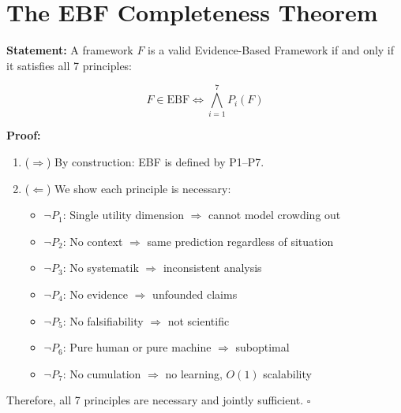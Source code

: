 \section{The EBF Completeness Theorem}
\label{sec:pr-completeness}

\begin{tcolorbox}[colback=blue!10!white, colframe=blue!75!black,
    title=\textbf{Theorem UNMAPPED_PR-1: EBF Completeness}]

\textbf{Statement:} A framework $F$ is a valid Evidence-Based Framework if and only if it satisfies all 7 principles:

\begin{equation}
F \in \text{EBF} \iff \bigwedge_{i=1}^{7} P_i(F)
\end{equation}

\textbf{Proof:}
\begin{enumerate}
    \item ($\Rightarrow$) By construction: EBF is defined by P1--P7.
    \item ($\Leftarrow$) We show each principle is necessary:
    \begin{itemize}[nosep]
        \item $\neg P_1$: Single utility dimension $\Rightarrow$ cannot model crowding out
        \item $\neg P_2$: No context $\Rightarrow$ same prediction regardless of situation
        \item $\neg P_3$: No systematik $\Rightarrow$ inconsistent analysis
        \item $\neg P_4$: No evidence $\Rightarrow$ unfounded claims
        \item $\neg P_5$: No falsifiability $\Rightarrow$ not scientific
        \item $\neg P_6$: Pure human or pure machine $\Rightarrow$ suboptimal
        \item $\neg P_7$: No cumulation $\Rightarrow$ no learning, $O(1)$ scalability
    \end{itemize}
\end{enumerate}

Therefore, all 7 principles are necessary and jointly sufficient. \hfill $\square$

\end{tcolorbox}


